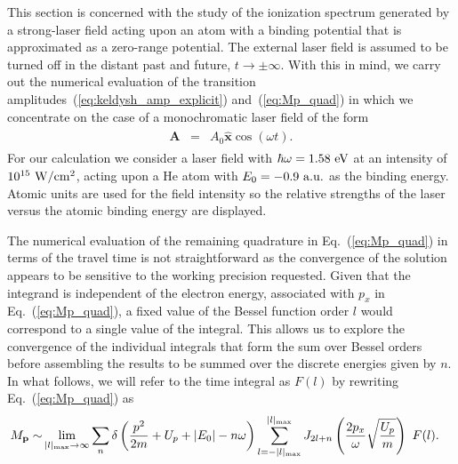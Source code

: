 This section is concerned with the study of the ionization spectrum
generated by a strong-laser field acting upon an atom with a binding
potential that is approximated as a zero-range potential. The external
laser field is assumed to be turned off in the distant past and
future, $t\to\pm\infty$. With this in mind, we carry out the numerical
evaluation of the transition
amplitudes~(\ref{eq:keldysh_amp_explicit}) and~(\ref{eq:Mp_quad}) in
which we concentrate on the case of a monochromatic laser field of the
form
%
\begin{eqnarray}
\label{eq:lp_field}
\begin{split}
\mathbf{A} & = & A_{0}\hat{\mathbf{x}} \cos(\omega t).
\end{split}
\end{eqnarray}
%
For our calculation we consider a laser field with $\hbar\omega =
1.58\ \rm{eV}$ at an intensity of $10^{15}\ \rm{W}/\rm{cm}^{2}$,
acting upon a He atom with $E_{0} = -0.9\ \rm{a.u.}$ as the binding
energy. Atomic units are used for the field intensity so the relative
strengths of the laser versus the atomic binding energy are displayed.

The numerical evaluation of the remaining quadrature in
Eq.~(\ref{eq:Mp_quad}) in terms of the travel time is not
straightforward as the convergence of the solution appears to be
sensitive to the working precision requested. Given that the integrand
is independent of the electron energy, associated with $p_{x}$ in
Eq.~(\ref{eq:Mp_quad}), a fixed value of the Bessel function order $l$
would correspond to a single value of the integral. This allows us to
explore the convergence of the individual integrals that form the sum
over Bessel orders before assembling the results to be summed over the
discrete energies given by $n$. In what follows, we will refer to the
time integral as $F(l)$ by rewriting Eq.~(\ref{eq:Mp_quad}) as
%
\begin{eqnarray}
\label{eq:Mp_rew}
\begin{split}
M_{\mathbf{p}} \sim &
  \lim\limits_{|l|_{\rm{max}}\to\infty}
\sum\limits_{n} \delta\left(\frac{p^{2}}{2m} + U_{p} + |E_{0}| - n\omega\right)
\sum\limits_{l=-|l|_{\rm{max}}}\limits^{|l|_{\rm{max}}}
J_{2l+n}\left( \frac{2p_{x}}{\omega} \sqrt{\frac{U_{p}}{m}} \right)\ F(l).
\end{split}
\end{eqnarray}
%

